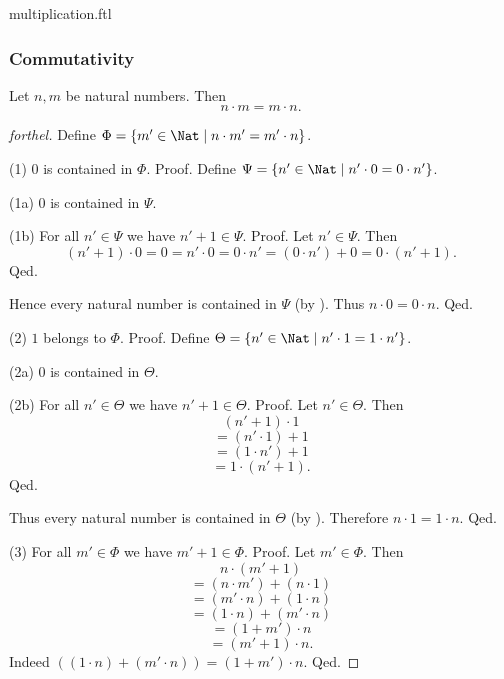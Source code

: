 \documentclass{naproche-library}
\begin{document}
\begin{smodule}{multiplication.ftl}
  \subsubsection*{Commutativity}

  \begin{proposition}[forthel,id=ARITHMETIC_06_1764759896588288]
    Let $n, m$ be natural numbers.
    Then \[ n \cdot m = m \cdot n. \]
  \end{proposition}
  \begin{proof}[forthel]
    Define $\Phi = \{ m' \in \Nat \mid n \cdot m' = m' \cdot n \}$.

    (1) $0$ is contained in $\Phi$. \newline
    Proof.
      Define $\Psi = \{ n' \in \Nat \mid n' \cdot 0 = 0 \cdot n' \}$.

      (1a) $0$ is contained in $\Psi$.

      (1b) For all $n' \in \Psi$ we have $n' + 1 \in \Psi$. \newline
      Proof.
        Let $n' \in \Psi$.
        Then
        \[ (n' + 1) \cdot 0
          = 0
          = n' \cdot 0
          = 0 \cdot n'
          = (0 \cdot n') + 0
          = 0 \cdot (n' + 1). \]
      Qed.

      Hence every natural number is contained in $\Psi$ (by ).
      Thus $n \cdot 0 = 0 \cdot n$.
    Qed.

    (2) $1$ belongs to $\Phi$. \newline
    Proof.
      Define $\Theta = \{ n' \in \Nat \mid n' \cdot 1 = 1 \cdot n' \}$.

      (2a) $0$ is contained in $\Theta$.

      (2b) For all $n' \in \Theta$ we have $n' + 1 \in \Theta$. \newline
      Proof.
        Let $n' \in \Theta$.
        Then
        \[  (n' + 1) \cdot 1        \]
        \[    = (n' \cdot 1) + 1    \]
        \[    = (1 \cdot n') + 1    \]
        \[    = 1 \cdot (n' + 1).   \]
      Qed.

      Thus every natural number is contained in $\Theta$ (by ).
      Therefore $n \cdot 1 = 1 \cdot n$.
    Qed.

    (3) For all $m' \in \Phi$ we have $m' + 1 \in \Phi$. \newline
    Proof.
      Let $m' \in \Phi$.
      Then
      \[  n \cdot (m' + 1)                \]
      \[    = (n \cdot m') + (n \cdot 1)  \]
      \[    = (m' \cdot n) + (1 \cdot n)  \]
      \[    = (1 \cdot n) + (m' \cdot n)  \]
      \[    = (1 + m') \cdot n            \]
      \[    = (m' + 1) \cdot n.           \]
      Indeed $((1 \cdot n) + (m' \cdot n)) = (1 + m') \cdot n$. %
    Qed.


\end{proof}
\end{smodule}
\end{document}
